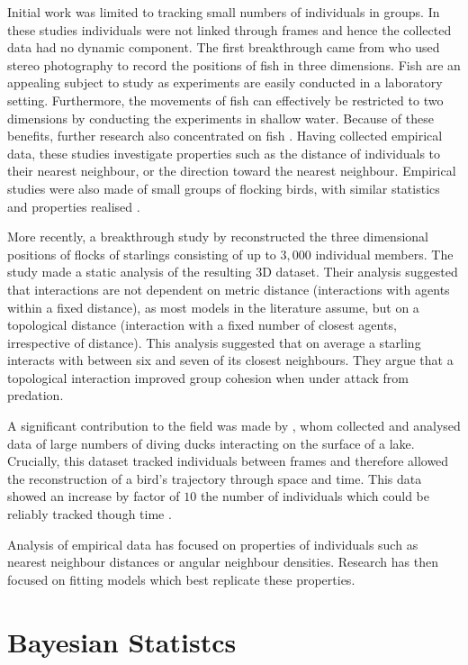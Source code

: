 Initial work was limited to tracking small numbers of individuals in groups. In these studies individuals were not linked through frames and hence the collected data had no dynamic component. The first breakthrough came from \citet{cullen65} who used stereo photography to record the positions of fish in three dimensions. Fish are an appealing subject to study as experiments are easily conducted in a laboratory setting. Furthermore, the movements of fish can effectively be restricted to two dimensions by conducting the experiments in shallow water. Because of these benefits, further research also concentrated on fish \citep{van_long85, partridge80}. Having collected empirical data, these studies investigate properties such as the distance of individuals to their nearest neighbour, or the direction toward the nearest neighbour. Empirical studies were also made of small groups of flocking birds, with similar statistics and properties realised \citep{major78, budgey98}.

More recently, a breakthrough study by \citet{ballerini08} reconstructed the three dimensional positions of flocks of starlings consisting of up to $3,000$ individual members. The study made a static analysis of the resulting 3D dataset. Their analysis suggested that interactions are not dependent on metric distance (interactions with agents within a fixed distance), as most models in the literature assume, but on a topological distance (interaction with a fixed number of closest agents, irrespective of distance). This analysis suggested that on average a starling interacts with between six and seven of its closest neighbours. They argue that a topological interaction improved group cohesion when under attack from predation.

A significant contribution to the field was made by \citet{lukeman10}, whom collected and analysed data of large numbers of diving ducks interacting on the surface of a lake. Crucially, this dataset tracked individuals between frames and therefore allowed the reconstruction of a bird's trajectory through space and time. This data showed an increase by factor of $10$ the number of individuals which could be reliably tracked though time \citep{lukeman09}.

Analysis of empirical data has focused on properties of individuals such as nearest neighbour distances or angular neighbour densities. Research has then focused on fitting models which best replicate these properties.

\section{Bayesian Statistcs}	
\label{sec:bayes_intro}

